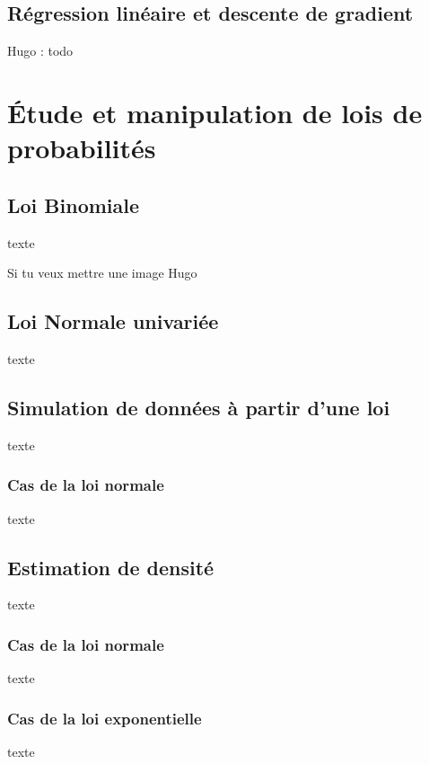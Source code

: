 \documentclass{article}      %
\begin{document}
\subsection{Régression linéaire et descente de gradient}
Hugo : todo

\section{Étude et manipulation de lois de probabilités}
\subsection{Loi Binomiale}
texte

Si tu veux mettre une image Hugo
\begin{figure}[H]
    \centering
     \scalebox{.35}{  %
    }
\end{figure}

\subsection{Loi Normale univariée}
texte
\subsection{Simulation de données à partir d’une loi}
texte

\subsubsection{Cas de la loi normale}
texte

\subsection{Estimation de densité}
texte

\subsubsection{Cas de la loi normale}
texte
\subsubsection{Cas de la loi exponentielle}
texte
\end{document}
